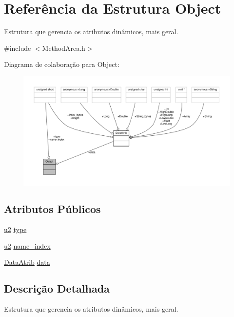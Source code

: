 \hypertarget{structObject}{}\section{Referência da Estrutura Object}
\label{structObject}


Estrutura que gerencia os atributos dinâmicos, mais geral.  




{\ttfamily \#include $<$Method\+Area.\+h$>$}



Diagrama de colaboração para Object\+:\nopagebreak
\begin{figure}[H]
\begin{center}
\leavevmode
\includegraphics[width=350pt]{structObject__coll__graph}
\end{center}
\end{figure}
\subsection*{Atributos Públicos}
\begin{DoxyCompactItemize}
\item 
\hyperlink{ClassLoader_8h_a5f223212eef04d10a4550ded680cb1cf}{u2} \hyperlink{structObject_a0d3800016b59f53a98979f1c05a166f6}{type}
\item 
\hyperlink{ClassLoader_8h_a5f223212eef04d10a4550ded680cb1cf}{u2} \hyperlink{structObject_a792741be5e389dce8261c75ada556006}{name\+\_\+index}
\item 
\hyperlink{unionDataAtrib}{Data\+Atrib} \hyperlink{structObject_aea3a2d0f5d67e5b8e9259f02f2b744da}{data}
\end{DoxyCompactItemize}


\subsection{Descrição Detalhada}
Estrutura que gerencia os atributos dinâmicos, mais geral. 

